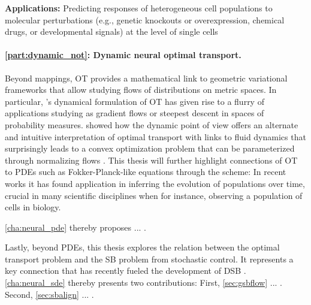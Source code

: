 \textbf{Applications:} Predicting responses of heterogeneous cell populations to molecular perturbations (e.g., genetic knockouts or overexpression, chemical drugs, or developmental signals) at the level of single cells


\paragraph{\cref{part:dynamic_not}: Dynamic neural optimal transport.}

Beyond mappings, OT provides a mathematical link to geometric variational frameworks that allow studying flows of distributions on metric spaces.
In particular, \citeauthor{brenier1987decomposition}'s dynamical formulation of OT has given rise to a flurry of applications studying  as gradient flows or steepest descent in spaces of probability measures.
\citet*{benamou2000computational} showed how the dynamic point of view offers an alternate and intuitive interpretation of optimal transport with links to fluid dynamics that surprisingly leads to a convex optimization problem that can be parameterized through normalizing flows \citep{tong2020trajectorynet}.
This thesis will further highlight connections of OT to PDEs such as Fokker-Planck-like equations through the \citeauthor*{jordan1998variational} scheme: In recent works \citep{bunne2022proximal, alvarez2021optimizing, mokrov2021large, benamou2016augmented} 
it has found application in inferring the evolution of populations over time, crucial in many scientific disciplines when for instance, observing a population of cells in biology.

\cref{cha:neural_pde} thereby proposes ... \citep{bunne2022proximal}.

Lastly, beyond PDEs, this thesis explores the relation between the optimal transport problem and the \acrfull{SB} problem from stochastic control. It represents a key connection that has recently fueled the development of \acrfull{DSB} \citep{de2021diffusion, chen2021stochastic, liu2022deep, bunne2022recovering}. \\
\cref{cha:neural_sde} thereby presents two contributions:
First, \cref{sec:gsbflow} ... \citep{bunne2022recovering}.
Second, \cref{sec:sbalign} ... \citep{somnath2023aligned}. \\

